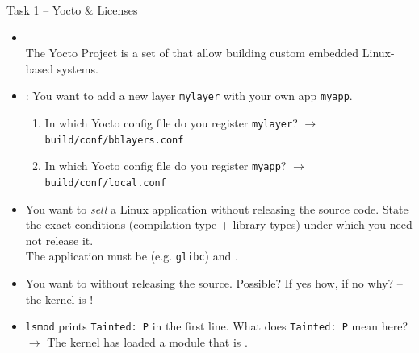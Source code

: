 \begin{example2}{Task 1 -- Yocto \& Licenses}
    \begin{itemize}
        \item {} \\ The Yocto Project is a set of  that allow building custom embedded Linux-based systems.
        \item {}: You want to add a new layer \texttt{mylayer} with your
              own app \texttt{myapp}.
              \begin{enumerate}
                  \item In which Yocto config file do you register \texttt{mylayer}? $\rightarrow$ \texttt{build/conf/bblayers.conf}
                  \item In which Yocto config file do you register \texttt{myapp}? $\rightarrow$ \texttt{build/conf/local.conf}
              \end{enumerate} 
        \item {} You want to \emph{sell} a Linux application without
              releasing the source code. State the exact conditions (compilation type
              + library types) under which you need not release it.\\
               The application must be  (e.g. \texttt{glibc}) and .
        \item You want to  without
              releasing the source. Possible? If yes how, if no why?
               -- the kernel is !
        \item {} \texttt{lsmod} prints \texttt{Tainted: P} in the first
              line. What does \texttt{Tainted: P} mean here?
              $\rightarrow$ The kernel has loaded a module that is .
    \end{itemize}
\end{example2}

\raggedcolumns
